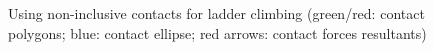 
\begin{figure}
\centering
  \centering
  \setlength\fboxsep{0pt}
  \setlength\fboxrule{1pt}
\caption{Using non-inclusive contacts for ladder climbing (green/red: contact polygons; blue: contact ellipse; red arrows: contact forces resultants)}
\label{fig:hrp2_jrl_complete}
\end{figure}

